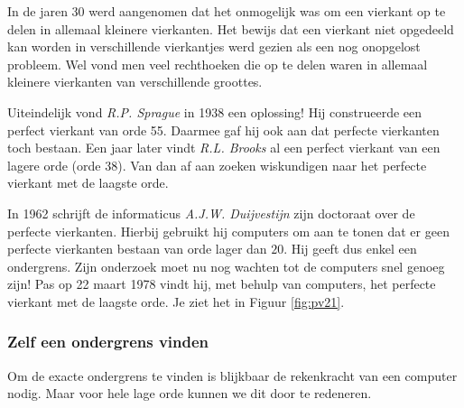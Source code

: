 In de jaren 30 werd aangenomen dat het onmogelijk was om een vierkant op te delen in allemaal kleinere vierkanten. Het bewijs dat een vierkant niet opgedeeld kan worden in verschillende vierkantjes werd gezien als een nog onopgelost probleem. Wel vond men veel rechthoeken die op te delen waren in allemaal kleinere vierkanten van verschillende groottes.

Uiteindelijk vond {\it R.P. Sprague} in 1938 een oplossing! Hij construeerde een perfect vierkant van orde 55. Daarmee gaf hij ook aan dat perfecte vierkanten toch bestaan. Een jaar later vindt {\it R.L. Brooks} al een perfect vierkant van een lagere orde (orde 38). Van dan af aan zoeken wiskundigen naar het perfecte vierkant met de laagste orde.

In 1962 schrijft de informaticus {\it A.J.W. Duijvestijn} zijn doctoraat over de perfecte vierkanten. Hierbij gebruikt hij computers om aan te tonen dat er geen perfecte vierkanten bestaan van orde lager dan $20$. Hij geeft dus enkel een ondergrens. Zijn onderzoek moet nu nog wachten tot de computers snel genoeg zijn! Pas op 22 maart 1978 vindt hij, met behulp van computers, het perfecte vierkant met de laagste orde. Je ziet het in Figuur \ref{fig:pv21}.

\subsubsection{Zelf een ondergrens vinden}

Om de exacte ondergrens te vinden is blijkbaar de rekenkracht van een computer nodig. Maar voor hele lage orde kunnen we dit door te redeneren.





